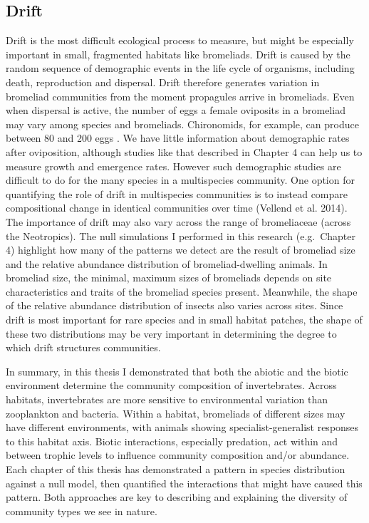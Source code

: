\subsection{Drift}\label{drift}

Drift is the most difficult ecological process to measure, but might be
especially important in small, fragmented habitats like bromeliads.
Drift is caused by the random sequence of demographic events in the life
cycle of organisms, including death, reproduction and dispersal. Drift
therefore generates variation in bromeliad communities from the moment
propagules arrive in bromeliads. Even when dispersal is active, the
number of eggs a female oviposits in a bromeliad may vary among species
and bromeliads. Chironomids, for example, can produce between 80 and 200
eggs \citep{chirobook}. We have little information about demographic
rates after oviposition, although studies like that described in Chapter
4 can help us to measure growth and emergence rates. However such
demographic studies are difficult to do for the many species in a
multispecies community. One option for quantifying the role of drift in
multispecies communities is to instead compare compositional change in
identical communities over time (Vellend et al. 2014). The importance of
drift may also vary across the range of bromeliaceae (across the
Neotropics). The null simulations I performed in this research
(e.g.~Chapter 4) highlight how many of the patterns we detect are the
result of bromeliad size and the relative abundance distribution of
bromeliad-dwelling animals. In bromeliad size, the minimal, maximum
sizes of bromeliads depends on site characteristics and traits of the
bromeliad species present. Meanwhile, the shape of the relative
abundance distribution of insects also varies across sites. Since drift
is most important for rare species and in small habitat patches, the
shape of these two distributions may be very important in determining
the degree to which drift structures communities.

In summary, in this thesis I demonstrated that both the abiotic and the
biotic environment determine the community composition of invertebrates.
Across habitats, invertebrates are more sensitive to environmental
variation than zooplankton and bacteria. Within a habitat, bromeliads of
different sizes may have different environments, with animals showing
specialist-generalist responses to this habitat axis. Biotic
interactions, especially predation, act within and between trophic
levels to influence community composition and/or abundance. Each chapter
of this thesis has demonstrated a pattern in species distribution
against a null model, then quantified the interactions that might have
caused this pattern. Both approaches are key to describing and
explaining the diversity of community types we see in nature.
